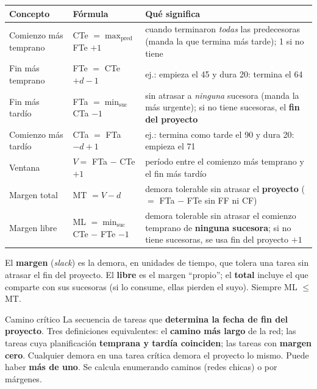 \documentclass[11pt,a4paper]{article}
\begin{document}
\begin{center}\small
\renewcommand{\arraystretch}{1.25}
\begin{tabularx}{\textwidth}{@{}l l X@{}}
\toprule
\textbf{Concepto} & \textbf{Fórmula} & \textbf{Qué significa}\\
\midrule
Comienzo más temprano & CTe $= \max_{\text{pred}}$ FTe $+ 1$ & cuando terminaron \emph{todas} las
predecesoras (manda la que termina más tarde); 1 si no tiene\\
Fin más temprano & FTe $=$ CTe $+ d - 1$ & ej.: empieza el 45 y dura 20: termina el 64\\
Fin más tardío & FTa $= \min_{\text{suc}}$ CTa $- 1$ & sin atrasar a \emph{ninguna} sucesora (manda la más
urgente); si no tiene sucesoras, el \textbf{fin del proyecto}\\
Comienzo más tardío & CTa $=$ FTa $- d + 1$ & ej.: termina como tarde el 90 y dura 20: empieza el 71\\
Ventana & $V =$ FTa $-$ CTe $+ 1$ & período entre el comienzo más temprano y el fin más tardío\\
Margen total & MT $= V - d$ & demora tolerable sin atrasar el \textbf{proyecto} ($=$ FTa $-$ FTe sin FF ni CF)\\
Margen libre & ML $= \min_{\text{suc}}$ CTe $-$ FTe $- 1$ & demora tolerable sin atrasar el comienzo temprano
de \textbf{ninguna sucesora}; si no tiene sucesoras, se usa fin del proyecto $+1$\\
\bottomrule
\end{tabularx}
\end{center}
El \textbf{margen} (\emph{slack}) es la demora, en unidades de tiempo, que tolera una tarea sin atrasar el fin
del proyecto. El \textbf{libre} es el margen ``propio''; el \textbf{total} incluye el que comparte con sus
sucesoras (si lo consume, ellas pierden el suyo). Siempre ML $\le$ MT.
\begin{defbox}{Camino crítico}
La secuencia de tareas que \textbf{determina la fecha de fin del proyecto}. Tres definiciones equivalentes: el
\textbf{camino más largo} de la red; las tareas cuya planificación \textbf{temprana y tardía coinciden}; las
tareas con \textbf{margen cero}. Cualquier demora en una tarea crítica demora el proyecto lo mismo. Puede haber
\textbf{más de uno}. Se calcula enumerando caminos (redes chicas) o por márgenes.
\end{defbox}
\end{document}
